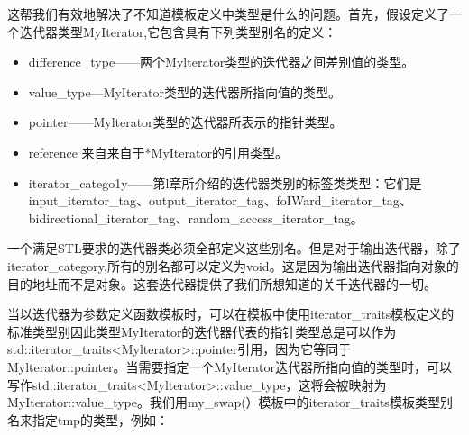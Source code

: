 这帮我们有效地解决了不知道模板定义中类型是什么的问题。首先，假设定义了一个迭代器类型MyIterator,它包含具有下列类型别名的定义：
	\begin{itemize}
	\item difference\_type——两个Mylterator类型的迭代器之间差别值的类型。
	\item value\_type—MyIterator类型的迭代器所指向值的类型。
	\item pointer——Mylterator类型的迭代器所表示的指针类型。
	\item reference 来自来自于*MyIterator的引用类型。
	\item iterator\_catego1y——第l章所介绍的迭代器类别的标签类类型：它们是input\_iterator\_tag、output\_iterator\_tag、foIWard\_iterator\_tag、bidirectional\_iterator\_tag、random\_access\_iterator\_tag。
	\end{itemize}
一个满足STL要求的迭代器类必须全部定义这些别名。但是对于输出迭代器，除了iterator\_category,所有的别名都可以定义为void。这是因为输出迭代器指向对象的目的地址而不是对象。这套迭代器提供了我们所想知道的关千迭代器的一切。


当以迭代器为参数定义函数模板时，可以在模板中使用iterator\_traits模板定义的标准类型别因此类型MyIterator的迭代器代表的指针类型总是可以作为\\std::iterator\_traits<Mylterator>::pointer引用，因为它等同于Mylterator::pointer。当需要指定一个MyIterator迭代器所指向值的类型时，可以写作std::iterator\_traits<Mylterator>::value\_type，这将会被映射为MyIterator::value\_type。我们用my\_swap(）模板中的iterator\_traits模板类型别名来指定tmp的类型，例如：


